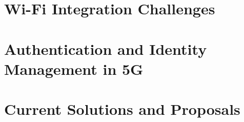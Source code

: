 \section{Wi-Fi Integration Challenges}

\section{Authentication and Identity Management in \ac{5G}}

\section{Current Solutions and Proposals}
